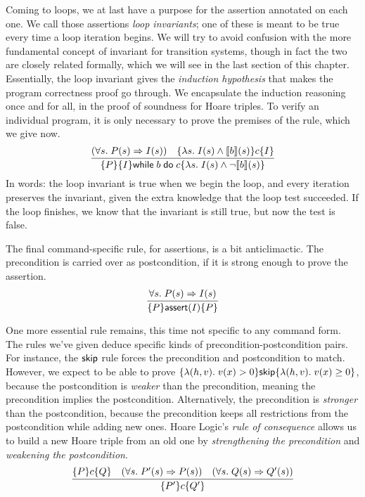 \documentclass{amsbook}
\theoremstyle{definition}
\theoremstyle{remark}
\numberwithin{section}{chapter}
\numberwithin{equation}{chapter}
\begin{document}
Coming to loops, we at last have a purpose for the assertion annotated on each one.
\invariants
We call those assertions \emph{loop invariants}; one of these is meant to be true every time a loop iteration begins.
We will try to avoid confusion with the more fundamental concept of invariant for transition systems, though in fact the two are closely related formally, which we will see in the last section of this chapter.
Essentially, the loop invariant gives the \emph{induction hypothesis} that makes the program correctness proof go through.
We encapsulate the induction reasoning once and for all, in the proof of soundness for Hoare triples.
To verify an individual program, it is only necessary to prove the premises of the rule, which we give now.
$$\infer{\hoare{P}{\{I\} \while{b}{c}}{\lambda s. \; I(s) \land \neg \denote{b}(s)}}{
  (\forall s. \; P(s) \Rightarrow I(s))
  & \hoare{\lambda s. \; I(s) \land \denote{b}(s)}{c}{I}
}$$
In words: the loop invariant is true when we begin the loop, and every iteration preserves the invariant, given the extra knowledge that the loop test succeeded.
If the loop finishes, we know that the invariant is still true, but now the test is false.

The final command-specific rule, for assertions, is a bit anticlimactic.
The precondition is carried over as postcondition, if it is strong enough to prove the assertion.
$$\infer{\hoare{P}{\assert{I}}{P}}{
  \forall s. \; P(s) \Rightarrow I(s)
}$$

One more essential rule remains, this time not specific to any command form.
The rules we've given deduce specific kinds of precondition-postcondition pairs.
For instance, the $\mathsf{skip}$ rule forces the precondition and postcondition to match.
However, we expect to be able to prove $\{\lambda (h, v). \; v(x) > 0\} \mathsf{skip} \{\lambda (h, v). \; v(x) \geq 0\}$, because the postcondition is \emph{weaker} than the precondition, meaning the precondition implies the postcondition.
Alternatively, the precondition is \emph{stronger} than the postcondition, because the precondition keeps all restrictions from the postcondition while adding new ones.
Hoare Logic's \emph{rule of consequence} allows us to build a new Hoare triple from an old one by \emph{strengthening the precondition} and \emph{weakening the postcondition}.
$$\infer{\hoare{P'}{c}{Q'}}{
  \hoare{P}{c}{Q}
  & (\forall s. \; P'(s) \Rightarrow P(s))
  & (\forall s. \; Q(s) \Rightarrow Q'(s))
}$$
\end{document}
